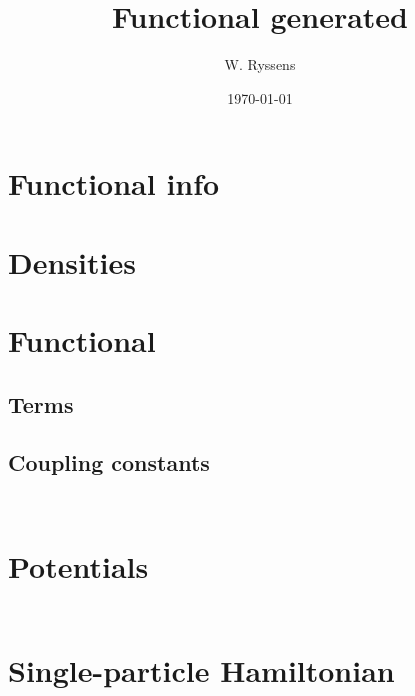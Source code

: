 \documentclass{article}
\author{W. Ryssens}
\date{\today}
\title{Functional generated}
\begin{document}
\maketitle

\section{Functional info}


\section{Densities}
\begin{itemize}

\end{itemize}

\section{Functional}
\subsection{Terms}
\begin{itemize}

\end{itemize}
\subsection{Coupling constants}
\begin{align}

\end{align}
\begin{align}

\end{align}

\section{Potentials}
\begin{align}

\end{align}

\section{Single-particle Hamiltonian}
\begin{align}

\end{align}
\end{document}
